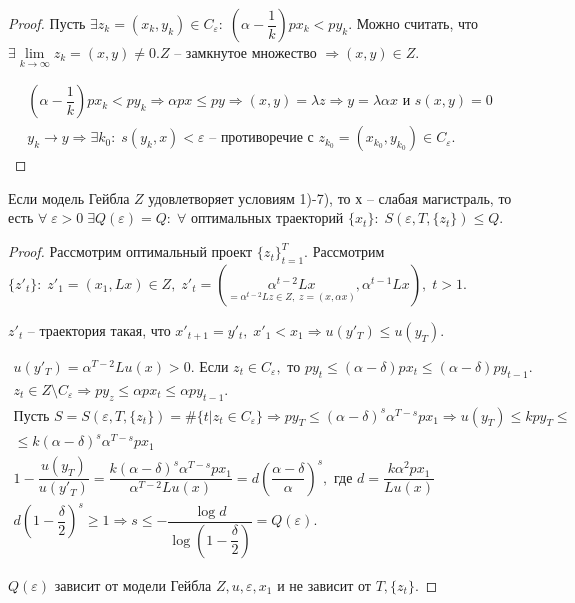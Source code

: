 \begin{proof}
	Пусть $\exists z_k = (x_k, y_k) \in C_{\varepsilon}: \; (\alpha - \dfrac{1}{k})px_k < p y_k.$ Можно считать, что $\exists \lim\limits_{k \to \infty} z_k = (x, y) \neq 0. Z$ -- замкнутое множество $\Rightarrow (x, y) \in Z.$

	$$\begin{gathered}
		(\alpha - \dfrac{1}{k})px_k < p y_k \Rightarrow  \alpha p x \leq py \Rightarrow (x, y) = \lambda z \Rightarrow y = \lambda \alpha x \text{ и } s(x, y) = 0 \\
		y_k \to y \Rightarrow \exists k_0: \; s(y_k, x) < \varepsilon \text{ -- противоречие с } z_{k_0} = (x_{k_0}, y_{k_0}) \in C_{\varepsilon}.
	\end{gathered}$$
\end{proof}

\begin{theorem}[Раднера]
	Если модель Гейбла $Z$ удовлетворяет условиям 1)-7), то х -- слабая магистраль, то есть $\forall \; \varepsilon > 0 \; \exists Q(\varepsilon) = Q: \; \forall$ оптимальных траекторий $\{ x_t \}: \; S(\varepsilon, T, \{ z_t \}) \leq Q.$
\end{theorem}

\begin{proof}
	Рассмотрим оптимальный проект $\{ z_t\}_{t = 1}^T$. Рассмотрим $\{ z'_t\}: \; z'_1 = (x_1, Lx) \in Z, \; z'_t = (\underset{= \alpha^{t - 2}Lz \in Z, \; z = (x, \alpha x)}{\alpha^{t - 2}Lx}, \alpha^{t - 1}Lx), \; t > 1.$

	$z'_t$ -- траектория такая, что $x'_{t+1} = y'_t, \; x'_1 < x_1 \Rightarrow u(y'_T) \leq u(y_T).$

	$$\begin{gathered}
		u(y'_T) = \alpha^{T - 2}Lu(x) > 0. \text{ Если } z_t \in C_{\varepsilon}, \text{ то } py_t \leq (\alpha - \delta)px_t \leq (\alpha - \delta)py_{t - 1}. \;\\
		z_t \in Z \setminus C_{\varepsilon} \Rightarrow py_z \leq \alpha p x_t \leq \alpha py_{t - 1}.\\
		\text{Пусть } S = S(\varepsilon, T, \{ z_t \}) = \#\{ t | z_t \in C_{\varepsilon} \} \Rightarrow py_T \leq (\alpha - \delta)^s \alpha^{T - s}px_1 \Rightarrow u(y_T) \leq k p y_T \leq \\ 
		\leq k(\alpha - \delta)^s \alpha^{T - s} p x_1\\
		1 - \dfrac{u(y_T)}{u(y'_T)} = \dfrac{k(\alpha - \delta)^s \alpha^{T - s} p x_1}{\alpha^{T - 2}Lu(x)} = d(\dfrac{\alpha - \delta}{\alpha})^s, \text{ где } d = \dfrac{k\alpha^2px_1}{Lu(x)}\\
		d(1 - \dfrac{\delta}{2})^s \geq 1 \Rightarrow s \leq -\dfrac{\log d}{\log (1 - \dfrac{\delta}{2})} = Q(\varepsilon).
	\end{gathered}$$

	$Q(\varepsilon)$ зависит от модели Гейбла $Z, u, \varepsilon, x_1$ и не зависит от $T, \{ z_t\}.$
\end{proof}